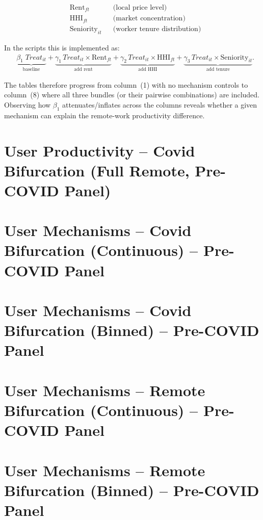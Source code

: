 \documentclass{article}
\newcommand{\cleanedresultsdir}{../../results/cleaned}
\begin{document}
\begin{landscape}
\begin{align*}
  &\text{Rent}_{ft} &&\text{(local price level)}\\
  &\text{HHI}_{ft}  &&\text{(market concentration)}\\
  &\text{Seniority}_{it} &&\text{(worker tenure distribution)}
\end{align*}

In the scripts this is implemented as:
\begin{align*}
  &\underbrace{\beta_1 \;\textit{Treat}_{it}}_{\text{baseline}} +
  \underbrace{\gamma_1\,\textit{Treat}_{it}\times\text{Rent}_{ft}}_{\text{add rent}} +
  \underbrace{\gamma_2\,\textit{Treat}_{it}\times\text{HHI}_{ft}}_{\text{add HHI}} +
  \underbrace{\gamma_3\,\textit{Treat}_{it}\times\text{Seniority}_{it}}_{\text{add tenure}}.
\end{align*}

The tables therefore progress from column~(1) with no mechanism controls to
column~(8) where all three bundles (or their pairwise combinations) are
included.  Observing how $\beta_1$ attenuates/inflates across the columns
reveals whether a given mechanism can explain the remote-work productivity
difference.

\fi

\section{User Productivity – Covid Bifurcation (Full Remote, Pre-COVID Panel)}


\section{User Mechanisms – Covid Bifurcation (Continuous) – Pre-COVID Panel}


\section{User Mechanisms – Covid Bifurcation (Binned) – Pre-COVID Panel}


\section{User Mechanisms – Remote Bifurcation (Continuous) – Pre-COVID Panel}


\section{User Mechanisms – Remote Bifurcation (Binned) – Pre-COVID Panel}


\end{landscape}
\end{document}
